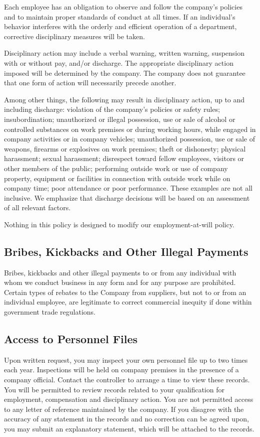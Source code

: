 \documentclass{book}
\begin{document}
Each employee has an obligation to observe and follow the company's policies and to maintain proper standards of conduct at all times. If an individual's behavior interferes with the orderly and efficient operation of a department, corrective disciplinary measures will be taken.

Disciplinary action may include a verbal warning, written warning, suspension with or without pay, and/or discharge. The appropriate disciplinary action imposed will be determined by the company. The company does not guarantee that one form of action will necessarily precede another.

Among other things, the following may result in disciplinary action, up to and including discharge: violation of the company's policies or safety rules; insubordination; unauthorized or illegal possession, use or sale of alcohol or controlled substances on work premises or during working hours, while engaged in company activities or in company vehicles; unauthorized possession, use or sale of weapons, firearms or explosives on work premises; theft or dishonesty; physical harassment; sexual harassment; disrespect toward fellow employees, visitors or other members of the public; performing outside work or use of company property, equipment or facilities in connection with outside work while on company time; poor attendance or poor performance. These examples are not all inclusive. We emphasize that discharge decisions will be based on an assessment of all relevant factors.

Nothing in this policy is designed to modify our employment-at-will policy.

\subsection{Bribes, Kickbacks and Other Illegal Payments}

Bribes, kickbacks and other illegal payments to or from any individual with whom we conduct business in any form and for any purpose are prohibited. Certain types of rebates to the Company from suppliers, but not to or from an individual employee, are legitimate to correct commercial inequity if done within government trade regulations.

\subsection{Access to Personnel Files}

Upon written request, you may inspect your own personnel file up to two times each year. Inspections will be held on company premises in the presence of a company official. Contact the controller to arrange a time to view these records. You will be permitted to review records related to your qualification for employment, compensation and disciplinary action. You are not permitted access to any letter of reference maintained by the company. If you disagree with the accuracy of any statement in the records and no correction can be agreed upon, you may submit an explanatory statement, which will be attached to the records.
\end{document}
